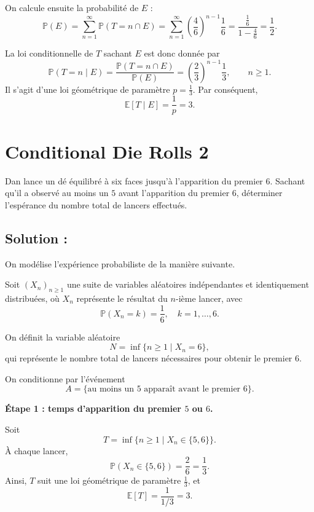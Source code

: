 On calcule ensuite la probabilité de $E$ :
\[
\mathbb{P}(E)
=
\sum_{n=1}^{\infty}\mathbb{P}(T=n\cap E)
=
\sum_{n=1}^{\infty}\left(\frac{4}{6}\right)^{n-1}\frac{1}{6}
=
\frac{\frac{1}{6}}{1-\frac{4}{6}}
=
\frac12.
\]

La loi conditionnelle de $T$ sachant $E$ est donc donnée par
\[
\mathbb{P}(T=n\mid E)
=
\frac{\mathbb{P}(T=n\cap E)}{\mathbb{P}(E)}
=
\left(\frac{2}{3}\right)^{n-1}\frac{1}{3},
\qquad n\ge 1.
\]
Il s'agit d'une loi géométrique de paramètre $p=\frac13$.
Par conséquent,
\[
\boxed{\mathbb{E}[T\mid E]=\frac{1}{p}=3.}
\]

\section{Conditional Die Rolls 2}


\begin{exerciseBox}
Dan lance un dé équilibré à six faces jusqu’à l’apparition du premier $6$.
Sachant qu’il a observé au moins un $5$ avant l’apparition du premier $6$,
déterminer l’espérance du nombre total de lancers effectués.
\end{exerciseBox}

\subsection*{Solution :}

On modélise l’expérience probabiliste de la manière suivante.

Soit $(X_n)_{n\geq 1}$ une suite de variables aléatoires indépendantes et identiquement distribuées,
où $X_n$ représente le résultat du $n$-ième lancer, avec
\[
\mathbb{P}(X_n = k) = \frac{1}{6}, \quad k=1,\dots,6.
\]

On définit la variable aléatoire
\[
N = \inf\{n \geq 1 \mid X_n = 6\},
\]
qui représente le nombre total de lancers nécessaires pour obtenir le premier $6$.

On conditionne par l’événement
\[
A = \{\text{au moins un } 5 \text{ apparaît avant le premier } 6\}.
\]

\medskip

\textbf{Étape 1 : temps d’apparition du premier $5$ ou $6$.}

Soit
\[
T = \inf\{n \geq 1 \mid X_n \in \{5,6\}\}.
\]
À chaque lancer,
\[
\mathbb{P}(X_n \in \{5,6\}) = \frac{2}{6} = \frac{1}{3}.
\]
Ainsi, $T$ suit une loi géométrique de paramètre $\frac{1}{3}$, et
\[
\mathbb{E}[T] = \frac{1}{1/3} = 3.
\]

